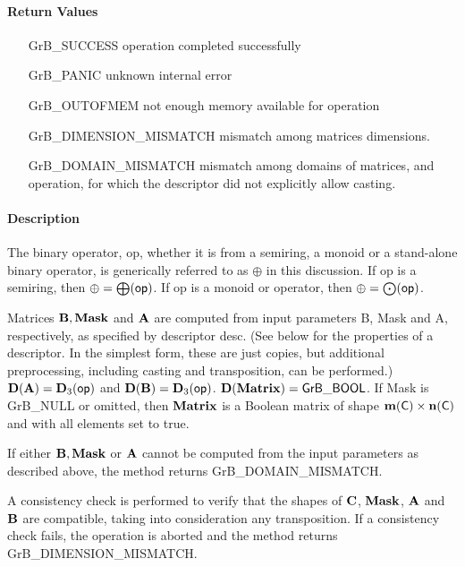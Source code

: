\paragraph{Return Values}

\begin{itemize}[leftmargin=2.1in]
    \item[{\sf GrB\_SUCCESS}]             operation completed successfully
    \item[{\sf GrB\_PANIC}]               unknown internal error
    \item[{\sf GrB\_OUTOFMEM}]            not enough memory available for operation
    \item[{\sf GrB\_DIMENSION\_MISMATCH}] mismatch among matrices dimensions.
    \item[{\sf GrB\_DOMAIN\_MISMATCH}]    mismatch among domains of matrices, and operation, for which the descriptor did not explicitly allow casting.
\end{itemize}

\paragraph{Description}

The binary operator, {\sf op}, whether it is from a semiring, a monoid or a stand-alone binary operator,
is generically referred to as $\oplus$ in this discussion.
If {\sf op} is a semiring, then $\oplus = \bigoplus({\sf op})$. 
If {\sf op} is a monoid or operator, then $\oplus = \bigodot({\sf op})$.

Matrices ${\bf B}, {\bf Mask}$ and ${\bf A}$ are computed from
input parameters {\sf B}, {\sf Mask} and {\sf A}, respectively, as specified
by descriptor {\sf desc}. (See below for the properties of a descriptor. In
the simplest form, these are just copies, but additional preprocessing,
including casting and transposition, can be performed.)  $\bold{D}({\bf A}) =
\bold{D}_3({\sf op})$ and $\bold{D}({\bf B}) = \bold{D}_3({\sf op})$.
$\bold{D}({\bf Matrix}) = {\sf GrB\_BOOL}$.  If {\sf Mask} is {\sf GrB\_NULL} or omitted,
then ${\bf Matrix}$ is a Boolean matrix of shape $\bold{m}({\bf \sf C}) \times \bold{n}({\bf \sf C})$
and with all elements set to {\sf true}.

If either ${\bf B}, {\bf Mask}$ or ${\bf A}$ cannot be computed
from the input parameters as described above, the method returns {\sf
    GrB\_DOMAIN\_MISMATCH}.

A consistency check is performed to verify that the shapes of ${\bf C}$, ${\bf Mask}$, ${\bf A}$ and ${\bf B}$
are compatible, taking into consideration any transposition. If a consistency check fails, the operation is
aborted and the method returns {\sf GrB\_DIMENSION\_MISMATCH}.

